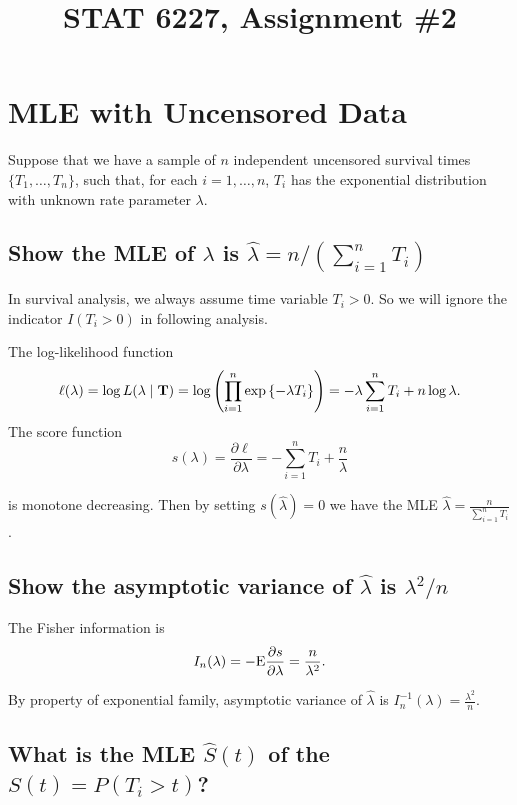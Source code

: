 \documentclass[11pt]{article}
\newcommand{\E}{\mbox{{\rm E}}}
\newcommand{\hS}{\hat{S}}
\newcommand{\hlam}{\hat{\lambda}}
\newcommand{\bT}{{\bf{T}}}
\begin{document}
\title{STAT 6227, Assignment \#2}

\maketitle

\section{MLE with Uncensored Data}

Suppose that we have a sample of $n$ independent uncensored survival times
$\{T_1,\dots,T_n\}$, such that, for each $i = 1,\dots,n$, $T_i$ has the
exponential distribution with unknown rate parameter $\lambda$.
\subsection{Show the MLE of $\lambda$ is $\hlam = n/(\sum_{i=1}^{n}T_{i})$}
In survival analysis, we always assume time variable $T_i>0$. So we will ignore the indicator
$I(T_i>0)$ in following analysis.

The log-likelihood function
\begin{equation*}
  \ell (\lambda) = \log L(\lambda\mid\bT)= \log \left(\prod_{i=1}^n \exp \left\{ -\lambda T_i \right\}\right)=-\lambda\sum_{i=1}^n T_i + n\log\lambda.
\end{equation*}
The score function
\begin{equation*}
s(\lambda) = \frac{\partial \ell}{\partial \lambda} = -\sum_{i=1}^n T_i + \frac{n}{\lambda}
\end{equation*}

is monotone decreasing. Then by setting $s(\hlam)=0$ we have the MLE $\hlam = \frac{n}{\sum_{i=1}^n T_i}$.

\subsection{Show the asymptotic variance of $\hlam$ is $\lambda^{2}/n$}

The Fisher information is
\begin{equation*}
I_n(\lambda) = -\E \frac{\partial s}{\partial \lambda} = \frac{n}{\lambda^2}.
\end{equation*}

By property of exponential family, asymptotic variance of $\hlam$ is
$I_n^{-1}(\lambda) = \frac{\lambda^2}{n}$.

\subsection{What is the MLE $\hS(t)$ of the $S(t) = P(T_{i}>t)$?}
\end{document}
